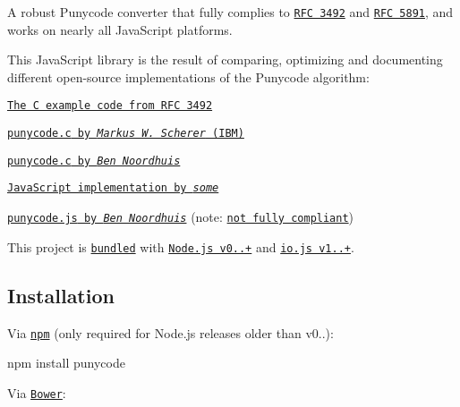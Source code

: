 A robust Punycode converter that fully complies to \href{https://tools.ietf.org/html/rfc3492}{\tt R\+FC 3492} and \href{https://tools.ietf.org/html/rfc5891}{\tt R\+FC 5891}, and works on nearly all Java\+Script platforms.

This Java\+Script library is the result of comparing, optimizing and documenting different open-\/source implementations of the Punycode algorithm\+:


\begin{DoxyItemize}
\item \href{https://tools.ietf.org/html/rfc3492#appendix-C}{\tt The C example code from R\+FC 3492}
\item \href{http://opensource.apple.com/source/ICU/ICU-400.42/icuSources/common/punycode.c}{\tt {\ttfamily punycode.\+c} by {\itshape Markus W. Scherer} (I\+BM)}
\item \href{https://github.com/bnoordhuis/punycode/blob/master/punycode.c}{\tt {\ttfamily punycode.\+c} by {\itshape Ben Noordhuis}}
\item \href{http://stackoverflow.com/questions/183485/can-anyone-recommend-a-good-free-javascript-for-punycode-to-unicode-conversion/301287#301287}{\tt Java\+Script implementation by {\itshape some}}
\item \href{https://github.com/joyent/node/blob/426298c8c1c0d5b5224ac3658c41e7c2a3fe9377/lib/punycode.js}{\tt {\ttfamily punycode.\+js} by {\itshape Ben Noordhuis}} (note\+: \href{https://github.com/joyent/node/issues/2072}{\tt not fully compliant})
\end{DoxyItemize}

This project is \href{https://github.com/joyent/node/blob/master/lib/punycode.js}{\tt bundled} with \href{https://github.com/joyent/node/compare/975f1930b1...61e796decc}{\tt Node.\+js v0..+} and \href{https://github.com/iojs/io.js/blob/v1.x/lib/punycode.js}{\tt io.\+js v1..+}.

\subsection*{Installation}

Via \href{https://www.npmjs.com/}{\tt npm} (only required for Node.\+js releases older than v0..)\+:


\begin{DoxyCode}
npm install punycode
\end{DoxyCode}


Via \href{http://bower.io/}{\tt Bower}\+:


